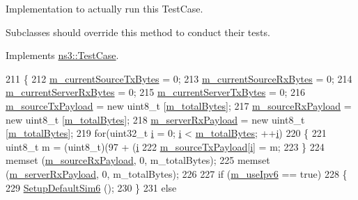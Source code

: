 Implementation to actually run this Test\+Case. 

Subclasses should override this method to conduct their tests. 

Implements \hyperlink{classns3_1_1TestCase_a8ff74680cf017ed42011e4be51917a24}{ns3\+::\+Test\+Case}.


\begin{DoxyCode}
211 \{
212   \hyperlink{classTcpTestCase_a41135a441155aab8e7d80acdf7c1a959}{m\_currentSourceTxBytes} = 0;
213   \hyperlink{classTcpTestCase_a955064e2af5b339a49a3aa3a04f166f8}{m\_currentSourceRxBytes} = 0;
214   \hyperlink{classTcpTestCase_aef99b385054dd7eb73a7e45b2ce3d976}{m\_currentServerRxBytes} = 0;
215   \hyperlink{classTcpTestCase_a3a7557075e3c745e487f76f26bca6423}{m\_currentServerTxBytes} = 0;
216   \hyperlink{classTcpTestCase_a04a966fbc1e4ab5a06cb67ce1279032b}{m\_sourceTxPayload} = \textcolor{keyword}{new} uint8\_t [\hyperlink{classTcpTestCase_a9b4497e157a0b1fb7fdf90e833696201}{m\_totalBytes}];
217   \hyperlink{classTcpTestCase_ac6e1dba9cf4a200de57b4247d383bbf4}{m\_sourceRxPayload} = \textcolor{keyword}{new} uint8\_t [\hyperlink{classTcpTestCase_a9b4497e157a0b1fb7fdf90e833696201}{m\_totalBytes}];
218   \hyperlink{classTcpTestCase_af1647be1c24b49579653f2c691bc802b}{m\_serverRxPayload} = \textcolor{keyword}{new} uint8\_t [\hyperlink{classTcpTestCase_a9b4497e157a0b1fb7fdf90e833696201}{m\_totalBytes}];
219   \textcolor{keywordflow}{for}(uint32\_t \hyperlink{bernuolliDistribution_8m_a6f6ccfcf58b31cb6412107d9d5281426}{i} = 0; \hyperlink{bernuolliDistribution_8m_a6f6ccfcf58b31cb6412107d9d5281426}{i} < \hyperlink{classTcpTestCase_a9b4497e157a0b1fb7fdf90e833696201}{m\_totalBytes}; ++\hyperlink{bernuolliDistribution_8m_a6f6ccfcf58b31cb6412107d9d5281426}{i})
220     \{
221       uint8\_t m = (uint8\_t)(97 + (\hyperlink{bernuolliDistribution_8m_a6f6ccfcf58b31cb6412107d9d5281426}{i} %
222       \hyperlink{classTcpTestCase_a04a966fbc1e4ab5a06cb67ce1279032b}{m\_sourceTxPayload}[\hyperlink{bernuolliDistribution_8m_a6f6ccfcf58b31cb6412107d9d5281426}{i}] = m;
223     \}
224   memset (\hyperlink{classTcpTestCase_ac6e1dba9cf4a200de57b4247d383bbf4}{m\_sourceRxPayload}, 0, m\_totalBytes);
225   memset (\hyperlink{classTcpTestCase_af1647be1c24b49579653f2c691bc802b}{m\_serverRxPayload}, 0, m\_totalBytes);
226 
227   \textcolor{keywordflow}{if} (\hyperlink{classTcpTestCase_a0fd3d3053ba2a160fbc60f6d40b5fe25}{m\_useIpv6} == \textcolor{keyword}{true})
228     \{
229       \hyperlink{classTcpTestCase_ad45a412dd010f36d8b396ab83df8acd6}{SetupDefaultSim6} ();
230     \}
231   \textcolor{keywordflow}{else}

\end{DoxyCode}
